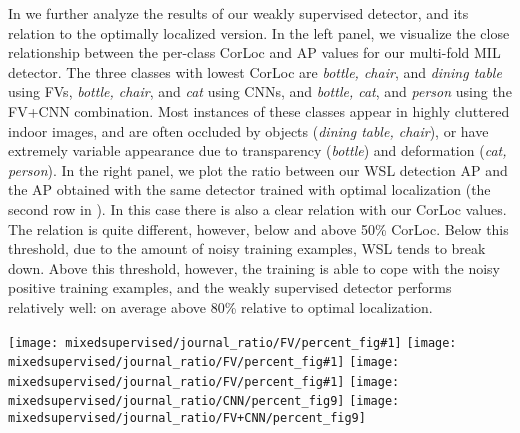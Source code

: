\documentclass[10pt,journal,cspaper,final,twocolumn,compsoc]{./IEEEtran}
\begin{document}
In  we further analyze the results of our
weakly supervised detector, and its relation to the
optimally localized version. In the left panel, we
visualize the close relationship between the per-class
CorLoc and AP values for our multi-fold MIL detector.  The
three classes with lowest \mbox{CorLoc}  are \emph{bottle, chair}, and \emph{dining
table} using FVs, \emph{bottle, chair}, and \emph{cat} using CNNs,
and \emph{bottle, cat}, and \emph{person} using the FV+CNN combination.
Most instances of these classes appear in highly cluttered indoor images,
and are often occluded by objects (\emph{dining table, chair}),
or have extremely variable
appearance due to transparency (\emph{bottle}) and deformation (\emph{cat, person}).
In the right panel, we plot the ratio between our WSL detection AP
and the AP obtained with the same
detector trained with optimal localization
(the second row in ).
In this case there is also a clear relation
with our CorLoc values. 
The relation is quite different,
however, below and above 50\% \mbox{CorLoc}. Below this
threshold, due to the amount of noisy training examples,
WSL tends to break down. Above this
threshold, however, the training is able to cope with the
noisy positive training examples, and the
weakly supervised detector performs relatively well: on
average above 80\% relative to optimal localization.

\def\myfig#1{\texttt{[image: mixedsupervised/journal\_ratio/FV/percent\_fig\#1]}}\begin{figure*}
\begin{center}
\myfig{2} \myfig{8} \myfig{9} \texttt{[image: mixedsupervised/journal\_ratio/CNN/percent\_fig9]} \texttt{[image: mixedsupervised/journal\_ratio/FV+CNN/percent\_fig9]}
\end{center}
\caption{Object detection results for training with mixed
supervision. Each curve shows the test set detection AP as a
function of the percentage of fully supervised positive
training images. The horizontal axes are in logarithmic scale. The first two plots show per-class curves
for selected classes using only FVs. The last
three plots show the detection AP values averaged over all
classes for the FV, CNN and FV+CNN features, respectively.
The solid curves correspond to mixed supervision. The dotted curves correspond to results obtained
by using only the fully-supervised examples.}
\label{fig:mixedsuper} 
\end{figure*}
\end{document}
